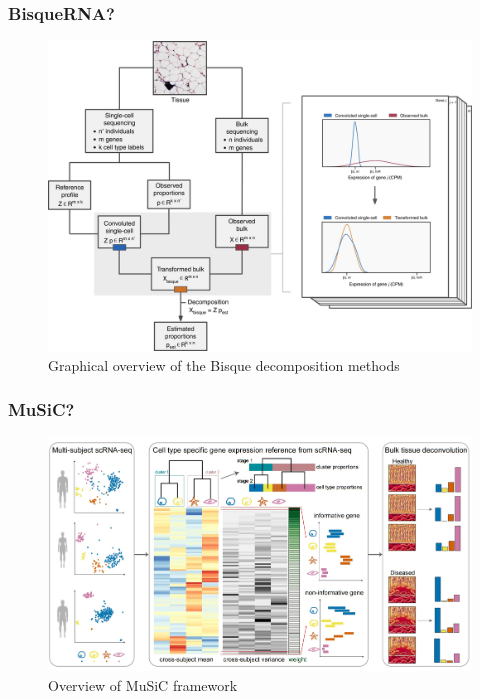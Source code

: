 \documentclass{beamer}
\begin{document}
    \begin{frame}
        \frametitle{BisqueRNA?}

        \begin{figure}
            \includegraphics[width=0.6 \linewidth]{figures/Workflow/Bisque.jpg}
            \caption{Graphical overview of the Bisque decomposition methods \protect\cite{Bisque1}}
        \end{figure}
    \end{frame}

    \begin{frame}
        \frametitle{MuSiC?}

        \begin{figure}
            \includegraphics[width=\linewidth]{figures/Workflow/MuSiC.jpg}
            \caption{Overview of MuSiC framework \protect\cite{MuSiC1}}
        \end{figure}
    \end{frame}
\end{document}
